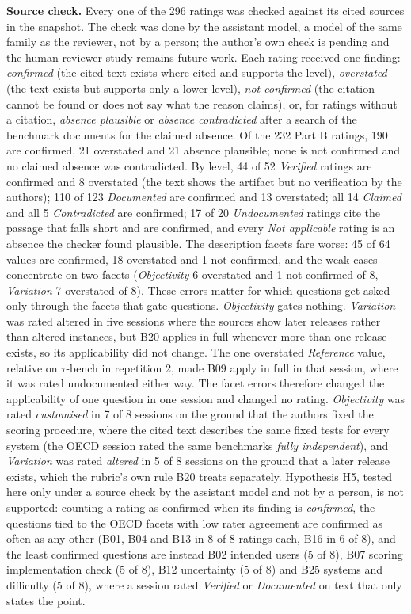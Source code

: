 \documentclass[10pt,conference]{IEEEtran}
\begin{document}
\textbf{Source check.} Every one of the 296 ratings was checked against its cited sources in the snapshot. The check was done by the assistant model, a model of the same family as the reviewer, not by a person; the author's own check is pending and the human reviewer study remains future work. Each rating received one finding: \emph{confirmed} (the cited text exists where cited and supports the level), \emph{overstated} (the text exists but supports only a lower level), \emph{not confirmed} (the citation cannot be found or does not say what the reason claims), or, for ratings without a citation, \emph{absence plausible} or \emph{absence contradicted} after a search of the benchmark documents for the claimed absence. Of the 232 Part B ratings, 190 are confirmed, 21 overstated and 21 absence plausible; none is not confirmed and no claimed absence was contradicted. By level, 44 of 52 \emph{Verified} ratings are confirmed and 8 overstated (the text shows the artifact but no verification by the authors); 110 of 123 \emph{Documented} are confirmed and 13 overstated; all 14 \emph{Claimed} and all 5 \emph{Contradicted} are confirmed; 17 of 20 \emph{Undocumented} ratings cite the passage that falls short and are confirmed, and every \emph{Not applicable} rating is an absence the checker found plausible. The description facets fare worse: 45 of 64 values are confirmed, 18 overstated and 1 not confirmed, and the weak cases concentrate on two facets (\emph{Objectivity} 6 overstated and 1 not confirmed of 8, \emph{Variation} 7 overstated of 8). These errors matter for which questions get asked only through the facets that gate questions. \emph{Objectivity} gates nothing. \emph{Variation} was rated altered in five sessions where the sources show later releases rather than altered instances, but B20 applies in full whenever more than one release exists, so its applicability did not change. The one overstated \emph{Reference} value, relative on $\tau$-bench in repetition 2, made B09 apply in full in that session, where it was rated undocumented either way. The facet errors therefore changed the applicability of one question in one session and changed no rating. \emph{Objectivity} was rated \emph{customised} in 7 of 8 sessions on the ground that the authors fixed the scoring procedure, where the cited text describes the same fixed tests for every system (the OECD session rated the same benchmarks \emph{fully independent}), and \emph{Variation} was rated \emph{altered} in 5 of 8 sessions on the ground that a later release exists, which the rubric's own rule B20 treats separately. Hypothesis H5, tested here only under a source check by the assistant model and not by a person, is not supported: counting a rating as confirmed when its finding is \emph{confirmed}, the questions tied to the OECD facets with low rater agreement are confirmed as often as any other (B01, B04 and B13 in 8 of 8 ratings each, B16 in 6 of 8), and the least confirmed questions are instead B02 intended users (5 of 8), B07 scoring implementation check (5 of 8), B12 uncertainty (5 of 8) and B25 systems and difficulty (5 of 8), where a session rated \emph{Verified} or \emph{Documented} on text that only states the point.
\end{document}
